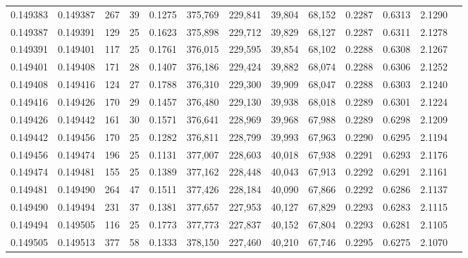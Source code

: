 \begin{tabular}{rrrrrrrrrrrrr}
0.149383 & 0.149387 & 267 &  39 &                                     0.1275 & 375,769 & 229,841 &  39,804 &  68,152 & 0.2287 & 0.6313 & 2.1290 \\
0.149387 & 0.149391 & 129 &  25 &                                     0.1623 & 375,898 & 229,712 &  39,829 &  68,127 & 0.2287 & 0.6311 & 2.1278 \\
0.149391 & 0.149401 & 117 &  25 &                                     0.1761 & 376,015 & 229,595 &  39,854 &  68,102 & 0.2288 & 0.6308 & 2.1267 \\
0.149401 & 0.149408 & 171 &  28 &                                     0.1407 & 376,186 & 229,424 &  39,882 &  68,074 & 0.2288 & 0.6306 & 2.1252 \\
0.149408 & 0.149416 & 124 &  27 &                                     0.1788 & 376,310 & 229,300 &  39,909 &  68,047 & 0.2288 & 0.6303 & 2.1240 \\
0.149416 & 0.149426 & 170 &  29 &                                     0.1457 & 376,480 & 229,130 &  39,938 &  68,018 & 0.2289 & 0.6301 & 2.1224 \\
0.149426 & 0.149442 & 161 &  30 &                                     0.1571 & 376,641 & 228,969 &  39,968 &  67,988 & 0.2289 & 0.6298 & 2.1209 \\
0.149442 & 0.149456 & 170 &  25 &                                     0.1282 & 376,811 & 228,799 &  39,993 &  67,963 & 0.2290 & 0.6295 & 2.1194 \\
0.149456 & 0.149474 & 196 &  25 &                                     0.1131 & 377,007 & 228,603 &  40,018 &  67,938 & 0.2291 & 0.6293 & 2.1176 \\
0.149474 & 0.149481 & 155 &  25 &                                     0.1389 & 377,162 & 228,448 &  40,043 &  67,913 & 0.2292 & 0.6291 & 2.1161 \\
0.149481 & 0.149490 & 264 &  47 &                                     0.1511 & 377,426 & 228,184 &  40,090 &  67,866 & 0.2292 & 0.6286 & 2.1137 \\
0.149490 & 0.149494 & 231 &  37 &                                     0.1381 & 377,657 & 227,953 &  40,127 &  67,829 & 0.2293 & 0.6283 & 2.1115 \\
0.149494 & 0.149505 & 116 &  25 &                                     0.1773 & 377,773 & 227,837 &  40,152 &  67,804 & 0.2293 & 0.6281 & 2.1105 \\
0.149505 & 0.149513 & 377 &  58 &                                     0.1333 & 378,150 & 227,460 &  40,210 &  67,746 & 0.2295 & 0.6275 & 2.1070 \\

\end{tabular}
